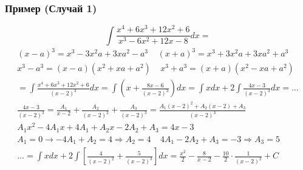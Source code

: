 \documentclass{article}
\begin{document}
\subsubsection{Пример (Случай 1)}
\[
    \int \frac{x^4 + 6x^3 + 12x^2 + 6}{x^3 - 6x^2 + 12x - 8} dx =
\]
\begin{gather*}
    (x - a)^3 = x^3 - 3x^2a + 3xa^2 - a^3 ~~~~~
    (x + a)^3 = x^3 + 3x^2a + 3xa^2 + a^3 \\
    x^3 - a^3 = (x - a)(x^2 + xa + a^2)   ~~~~~
    x^3 + a^3 = (x + a)(x^2 - xa + a^2)   \\
    = \int \frac{x^4 + 6x^3 + 12x^2 + 6}{(x - 2)^3} dx = 
      \int \left(x + \frac{8x - 6}{(x - 2)^3}\right) dx =
      \int x dx + 2 \int \frac{4x - 3}{(x - 2)^3} dx = \dots \\
      \frac{4x - 3}{(x - 2)^3} = \frac{A_1}{x - 2} + \frac{A_2}{(x - 2)^2} + \frac{A_3}{(x - 2)^3} =
      \frac{A_1(x - 2)^2 + A_2(x - 2) + A_3}{(x - 2)^3} \\
      A_1 x^2 - 4 A_1 x + 4A_1 + A_2 x - 2 A_2 + A_3 = 4x - 3 \\
      A_1 = 0 \rightarrow -4A_1 + A_2 = 4 \Rightarrow A_2 = 4 ~~~~~
      4A_1 - 2A_2 + A_3 = -3 \Rightarrow A_3 = 5 \\
      \dots = \int x dx + 2 \int \left[ \frac{4}{(x - 2)^2} + \frac{5}{(x - 2)^3} \right] dx =
      \frac{x^2}{2} - \frac{8}{x - 2} - \frac{10}{2} \cdot \frac{1}{(x - 2)^2} + C
\end{gather*}
\end{document}

